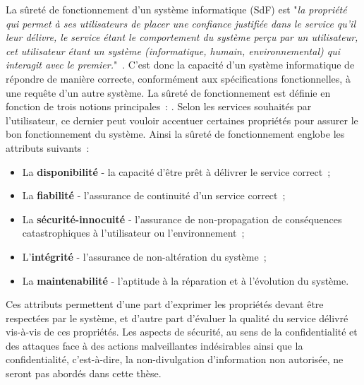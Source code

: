 \documentclass[french, a4paper, 11pt, twoside, pdftex]{StyleThese}
\begin{document}
		La sûreté de fonctionnement d’un système informatique (SdF) est "\textit{la propriété qui permet à ses utilisateurs de placer une confiance justifiée dans le service qu’il leur délivre, le service étant le comportement du système perçu par un utilisateur, cet utilisateur étant un système (informatique, humain, environnemental) qui interagit avec le premier.}"~\cite{arlat1995guide}. C’est donc la capacité d’un système informatique de répondre de manière correcte, conformément aux spécifications fonctionnelles, à une requête d’un autre système.  
		La sûreté de fonctionnement est définie en fonction de trois notions principales~: .  
		Selon les services souhaités par l’utilisateur, ce dernier peut vouloir accentuer certaines propriétés pour assurer le bon fonctionnement du système. Ainsi la sûreté de fonctionnement englobe les attributs suivants~:  
		\begin{itemize}
			\item 	La \textbf{disponibilité} - la capacité d’être prêt à délivrer le service correct~; 
			\item 	La \textbf{fiabilité} - l’assurance de continuité d’un service correct~; 
			\item 	La \textbf{sécurité-innocuité} - l’assurance de non-propagation de conséquences catastrophiques à l’utilisateur ou l’environnement~; 
			\item 	L’\textbf{intégrité} - l’assurance de non-altération du système~; 
			\item 	La \textbf{maintenabilité} - l’aptitude à la réparation et à l’évolution du système. 
		\end{itemize} 
		Ces attributs permettent d’une part d’exprimer les propriétés devant être respectées par le système, et d’autre part d’évaluer la qualité du service délivré vis-à-vis de ces propriétés. Les aspects de sécurité, au sens de la confidentialité et des attaques face à des actions malveillantes indésirables ainsi que la confidentialité, c'est-à-dire, la non-divulgation d'information non autorisée, ne seront pas abordés dans cette thèse.
		
\end{document}
